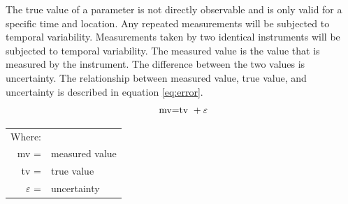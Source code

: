 %


The true value of a parameter is not directly observable and is only valid for a specific time and location.  Any repeated measurements will be subjected to temporal variability.  Measurements taken by two identical instruments will be subjected to temporal variability.  The measured value is the value that is measured by the instrument.  The difference between the two values is uncertainty.  The relationship between measured value, true value, and uncertainty is described in equation \ref{eq:error}.
\begin{equation}
\label{eq:error}
\textnormal{ mv=tv } + \varepsilon
\end{equation}
\begin{tabularx}{6in}{r X}
	Where:&\\
	mv = & measured value\\
	tv = & true value\\
	$\varepsilon$ = & uncertainty\\
\end{tabularx}\\

